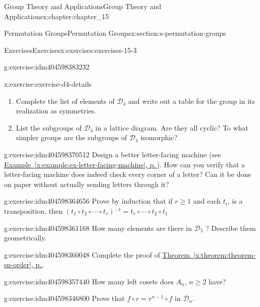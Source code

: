 \documentclass[twoside,10pt,]{book}
\newcommand{\xreffont}{\relax}
\numberwithin{equation}{section}
\begin{document}
\begin{chapterptx}{Group Theory and Applications}{}{Group Theory and Applications}{}{}{x:chapter:chapter_15}
\begin{sectionptx}{Permutation Groups}{}{Permutation Groups}{}{}{x:section:s-permutation-groups}
\begin{exercises-subsection}{Exercises}{}{Exercises}{}{}{x:exercises:exercises-15-3}
\begin{divisionexercise}{4}{}{}{g:exercise:idm404598383232}
\end{divisionexercise}%
\begin{divisionexercise}{5}{}{}{x:exercise:exercise-d4-details}%
%
\begin{enumerate}[label=(\alph*)]
\item{}Complete the list of elements of \(\mathcal{D}_4\) and write out a table for the group in its realization as symmetries.%
\item{}List the subgroups of \(\mathcal{D}_4\) in a lattice diagram. Are they all cyclic? To what simpler groups are the subgroups of \(\mathcal{D}_4\) isomorphic?%
\end{enumerate}
%
\end{divisionexercise}%
\begin{divisionexercise}{6}{}{}{g:exercise:idm404598370512}%
Design a better letter-facing machine (see \hyperref[x:example:ex-letter-facing-machine]{Example~{\xreffont\ref{x:example:ex-letter-facing-machine}}, p.\,\pageref{x:example:ex-letter-facing-machine}}). How can you verify that a letter-facing machine does indeed check every corner of a letter? Can it be done on paper without actually sending letters through it?%
\end{divisionexercise}%
\begin{divisionexercise}{7}{}{}{g:exercise:idm404598364656}%
Prove by induction that if \(r \geq  1\) and each \(t_i\), is a transposition, then  \(\left(t_1\circ t_2\circ \cdots \circ t_r\right){}^{-1}=t_r\circ \cdots \circ t_2\circ t_1\)%
\end{divisionexercise}%
\begin{divisionexercise}{8}{}{}{g:exercise:idm404598361168}%
How many elements are there in \(\mathcal{D}_5\) ? Describe them geometrically.%
\end{divisionexercise}%
\begin{divisionexercise}{9}{}{}{g:exercise:idm404598360048}%
Complete the proof of \hyperref[x:theorem:theorem-sn-order]{Theorem~{\xreffont\ref{x:theorem:theorem-sn-order}}, p.\,\pageref{x:theorem:theorem-sn-order}}.%
\end{divisionexercise}%
\begin{divisionexercise}{10}{}{}{g:exercise:idm404598357440}%
How many left cosets does \(A_n\), \(n\geq 2\) have?%
\end{divisionexercise}%
\begin{divisionexercise}{11}{}{}{g:exercise:idm404598346800}%
Prove that  \(f\circ r= r^{n-1}\circ f\) in \(\mathcal{D}_n\).%
\end{divisionexercise}%

\end{exercises-subsection}
\end{sectionptx}
\end{chapterptx}
\end{document}
